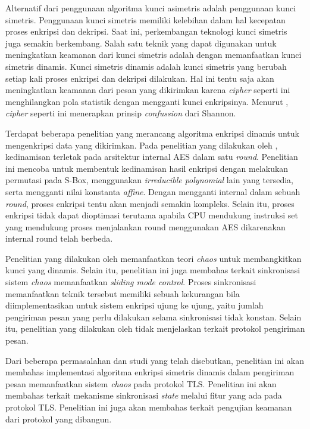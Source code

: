 Alternatif dari penggunaan algoritma kunci asimetris adalah penggunaan kunci simetris. Penggunaan kunci simetris memiliki kelebihan dalam hal kecepatan proses enkripsi dan dekripsi. Saat ini, perkembangan teknologi kunci simetris juga semakin berkembang. Salah satu teknik yang dapat digunakan untuk meningkatkan keamanan dari kunci simetris adalah dengan memanfaatkan kunci simetris dinamis. Kunci simetris dinamis adalah kunci simetris yang berubah setiap kali proses enkripsi dan dekripsi dilakukan. Hal ini tentu saja akan meningkatkan keamanan dari pesan yang dikirimkan karena \emph{cipher} seperti ini menghilangkan pola statistik dengan mengganti kunci enkripsinya. Menurut \textcite{munir2019}, \emph{cipher} seperti ini menerapkan prinsip \emph{confussion} dari Shannon.

Terdapat beberapa penelitian yang merancang algoritma enkripsi dinamis untuk mengenkripsi data yang dikirimkan. Pada penelitian yang dilakukan oleh \textcite{singh2019}, kedinamisan terletak pada arsitektur internal AES dalam satu \emph{round}. Penelitian ini mencoba untuk membentuk kedinamisan hasil enkripsi dengan melakukan permutasi pada S-Box, menggunakan \emph{irreducible polynomial} lain yang tersedia, serta mengganti nilai konstanta \emph{affine}. Dengan mengganti internal dalam sebuah \emph{round}, proses enkripsi tentu akan menjadi semakin kompleks. Selain itu, proses enkripsi tidak dapat dioptimasi terutama apabila CPU mendukung instruksi set yang mendukung proses menjalankan round menggunakan AES dikarenakan internal round telah berbeda.

Penelitian yang dilakukan oleh \textcite{lin2021} memanfaatkan teori \emph{chaos} untuk membangkitkan kunci yang dinamis. Selain itu, penelitian ini juga membahas terkait sinkronisasi sistem \emph{chaos} memanfaatkan \emph{sliding mode control}. Proses sinkronisasi memanfaatkan teknik tersebut memiliki sebuah kekurangan bila diimplementasikan untuk sistem enkripsi ujung ke ujung, yaitu jumlah pengiriman pesan yang perlu dilakukan selama sinkronisasi tidak konstan. Selain itu, penelitian yang dilakukan oleh \textcite{lin2021} tidak menjelaskan terkait protokol pengiriman pesan.

Dari beberapa permasalahan dan studi yang telah disebutkan, penelitian ini akan membahas implementasi algoritma enkripsi simetris dinamis dalam pengiriman pesan memanfaatkan sistem \emph{chaos} pada protokol TLS. Penelitian ini akan membahas terkait mekanisme sinkronisasi \emph{state} melalui fitur yang ada pada protokol TLS. Penelitian ini juga akan membahas terkait pengujian keamanan dari protokol yang dibangun.

